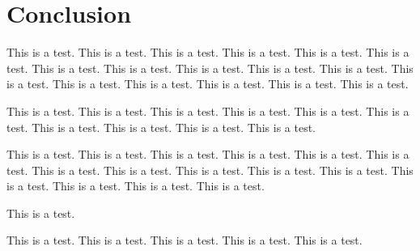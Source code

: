 \documentclass[twoside]{article}
\begin{document}
\section{Conclusion}

This is a test.
This is a test.
This is a test.
This is a test.
This is a test.
This is a test.
This is a test.
This is a test.
This is a test.
This is a test.
This is a test.
This is a test.
This is a test.
This is a test.
This is a test.
This is a test.
This is a test.

This is a test.
This is a test.
This is a test.
This is a test.
This is a test.
This is a test.
This is a test.
This is a test.
This is a test.
This is a test.

This is a test.
This is a test.
This is a test.
This is a test.
This is a test.
This is a test.
This is a test.
This is a test.
This is a test.
This is a test.
This is a test.
This is a test.
This is a test.
This is a test.
This is a test.

This is a test.

This is a test.
This is a test.
This is a test.
This is a test.
This is a test.




\end{document}
